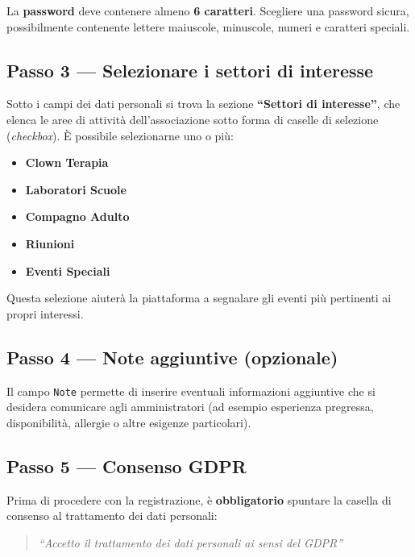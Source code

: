 \documentclass[a4paper,11pt,oneside]{book}
\newcommand{\campo}[1]{\texttt{#1}}
\begin{document}
\begin{warningbox}
La \textbf{password} deve contenere almeno \textbf{6 caratteri}. Scegliere una password sicura, possibilmente contenente lettere maiuscole, minuscole, numeri e caratteri speciali.
\end{warningbox}

\subsection{Passo 3 --- Selezionare i settori di interesse}

Sotto i campi dei dati personali si trova la sezione \textbf{``Settori di interesse''}, che elenca le aree di attivit\`a dell'associazione sotto forma di caselle di selezione (\textit{checkbox}). \`E possibile selezionarne uno o pi\`u:

\begin{itemize}[leftmargin=1.5em]
  \item \textbf{Clown Terapia}
  \item \textbf{Laboratori Scuole}
  \item \textbf{Compagno Adulto}
  \item \textbf{Riunioni}
  \item \textbf{Eventi Speciali}
\end{itemize}

Questa selezione aiuter\`a la piattaforma a segnalare gli eventi pi\`u pertinenti ai propri interessi.

\subsection{Passo 4 --- Note aggiuntive (opzionale)}

Il campo \campo{Note} permette di inserire eventuali informazioni aggiuntive che si desidera comunicare agli amministratori (ad esempio esperienza pregressa, disponibilit\`a, allergie o altre esigenze particolari).

\subsection{Passo 5 --- Consenso GDPR}

Prima di procedere con la registrazione, \`e \textbf{obbligatorio} spuntare la casella di consenso al trattamento dei dati personali:

\begin{quote}
\textit{``Accetto il trattamento dei dati personali ai sensi del GDPR''}
\end{quote}
\end{document}
